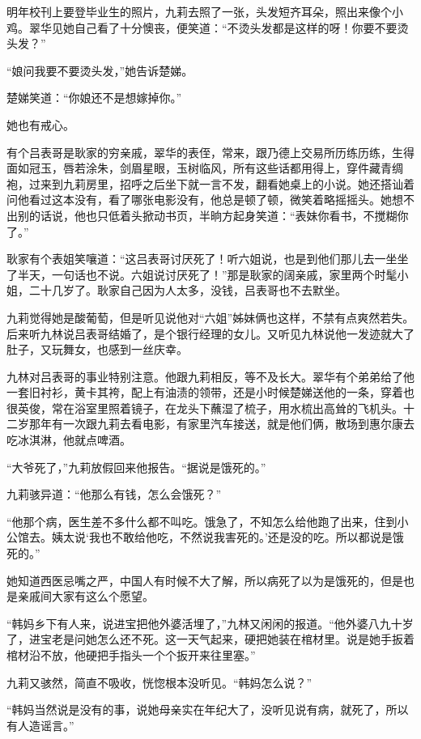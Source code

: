 \par 明年校刊上要登毕业生的照片，九莉去照了一张，头发短齐耳朵，照出来像个小鸡。翠华见她自己看了十分懊丧，便笑道：“不烫头发都是这样的呀！你要不要烫头发？”
\par “娘问我要不要烫头发，”她告诉楚娣。
\par 楚娣笑道：“你娘还不是想嫁掉你。”
\par 她也有戒心。
\par 有个吕表哥是耿家的穷亲戚，翠华的表侄，常来，跟乃德上交易所历练历练，生得面如冠玉，唇若涂朱，剑眉星眼，玉树临风，所有这些话都用得上，穿件藏青绸袍，过来到九莉房里，招呼之后坐下就一言不发，翻看她桌上的小说。她还搭讪着问他看过这本没有，看了哪张电影没有，他总是顿了顿，微笑着略摇摇头。她想不出别的话说，他也只低着头掀动书页，半晌方起身笑道：“表妹你看书，不搅糊你了。”
\par 耿家有个表姐笑嚷道：“这吕表哥讨厌死了！听六姐说，也是到他们那儿去一坐坐了半天，一句话也不说。六姐说讨厌死了！”那是耿家的阔亲戚，家里两个时髦小姐，二十几岁了。耿家自己因为人太多，没钱，吕表哥也不去默坐。
\par 九莉觉得她是酸葡萄，但是听见说他对“六姐”姊妹俩也这样，不禁有点爽然若失。后来听九林说吕表哥结婚了，是个银行经理的女儿。又听见九林说他一发迹就大了肚子，又玩舞女，也感到一丝庆幸。
\par 九林对吕表哥的事业特别注意。他跟九莉相反，等不及长大。翠华有个弟弟给了他一套旧衬衫，黄卡其袴，配上有油渍的领带，还是小时候楚娣送他的一条，穿着也很英俊，常在浴室里照着镜子，在龙头下蘸湿了梳子，用水梳出高耸的飞机头。十二岁那年有一次跟九莉去看电影，有家里汽车接送，就是他们俩，散场到惠尔康去吃冰淇淋，他就点啤酒。
\par “大爷死了，”九莉放假回来他报告。“据说是饿死的。”
\par 九莉骇异道：“他那么有钱，怎么会饿死？”
\par “他那个病，医生差不多什么都不叫吃。饿急了，不知怎么给他跑了出来，住到小公馆去。姨太说‘我也不敢给他吃，不然说我害死的。’还是没的吃。所以都说是饿死的。”
\par 她知道西医忌嘴之严，中国人有时候不大了解，所以病死了以为是饿死的，但是也是亲戚间大家有这么个愿望。
\par “韩妈乡下有人来，说进宝把他外婆活埋了，”九林又闲闲的报道。“他外婆八九十岁了，进宝老是问她怎么还不死。这一天气起来，硬把她装在棺材里。说是她手扳着棺材沿不放，他硬把手指头一个个扳开来往里塞。”
\par 九莉又骇然，简直不吸收，恍惚根本没听见。“韩妈怎么说？”
\par “韩妈当然说是没有的事，说她母亲实在年纪大了，没听见说有病，就死了，所以有人造谣言。”
